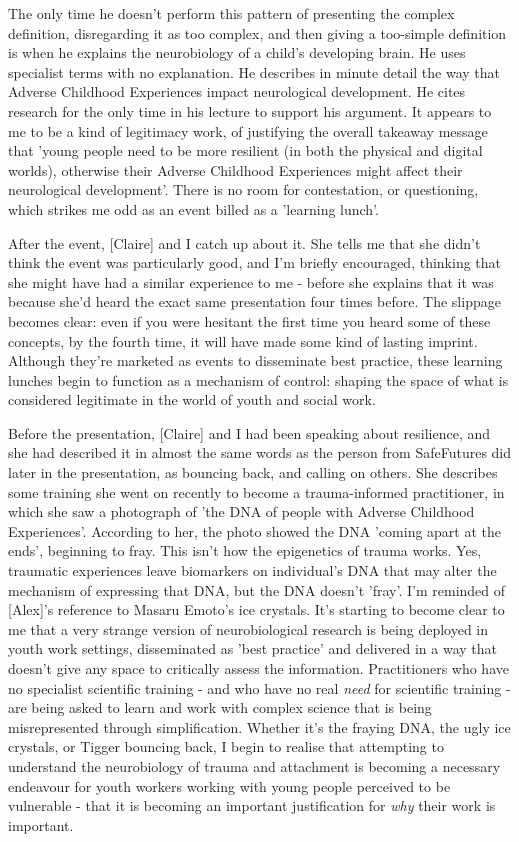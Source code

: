 The only time he doesn't perform this pattern of presenting the complex definition, disregarding it as too complex, and then giving a too-simple definition is when he explains the neurobiology of a child's developing brain. He uses specialist terms with no explanation. He describes in minute detail the way that Adverse Childhood Experiences impact neurological development. He cites research for the only time in his lecture to support his argument. It appears to me to be a kind of legitimacy work, of justifying the overall takeaway message that 'young people need to be more resilient (in both the physical and digital worlds), otherwise their Adverse Childhood Experiences might affect their neurological development'. There is no room for contestation, or questioning, which strikes me odd as an event billed as a 'learning lunch'.

After the event, [Claire] and I catch up about it. She tells me that she didn't think the event was particularly good, and I'm briefly encouraged, thinking that she might have had a similar experience to me - before she explains that it was because she'd heard the exact same presentation four times before. The slippage becomes clear: even if you were hesitant the first time you heard some of these concepts, by the fourth time, it will have made some kind of lasting imprint. Although they're marketed as events to disseminate best practice, these learning lunches begin to function as a mechanism of control: shaping the space of what is considered legitimate in the world of youth and social work. 

Before the presentation, [Claire] and I had been speaking about resilience, and she had described it in almost the same words as the person from SafeFutures did later in the presentation, as bouncing back, and calling on others. She describes some training she went on recently to become a trauma-informed practitioner, in which she saw a photograph of 'the DNA of people with Adverse Childhood Experiences'. According to her, the photo showed the DNA 'coming apart at the ends', beginning to fray. This isn't how the epigenetics of trauma works. Yes, traumatic experiences leave biomarkers on individual's DNA that may alter the mechanism of expressing that DNA, but the DNA doesn't 'fray'. I'm reminded of [Alex]'s reference to Masaru Emoto's ice crystals. It's starting to become clear to me that a very strange version of neurobiological research is being deployed in youth work settings, disseminated as 'best practice' and delivered in a way that doesn't give any space to critically assess the information. Practitioners who have no specialist scientific training - and who have no real \textit{need} for scientific training - are being asked to learn and work with complex science that is being misrepresented through simplification. Whether it's the fraying DNA, the ugly ice crystals, or Tigger bouncing back, I begin to realise that attempting to understand the neurobiology of trauma and attachment is becoming a necessary endeavour for youth workers working with young people perceived to be vulnerable - that it is becoming an important justification for \textit{why} their work is important.

